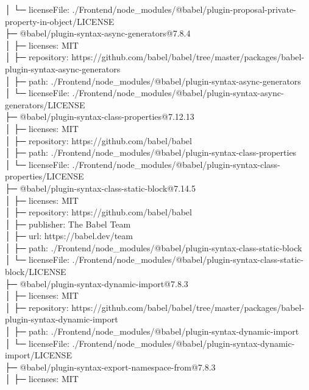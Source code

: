 \documentclass[
    paper=a4,
    twoside=false,
    parskip=half,
    listof=entryprefix,
    listof=totoc,
    index=totoc,
    bibliography=totoc,
    headsepline,
]{scrbook}
\begin{document}
    │  └─ licenseFile: ./Frontend/node\_modules/@babel/plugin-proposal-private-property-in-object/LICENSE\\
    ├─ @babel/plugin-syntax-async-generators@7.8.4\\
    │  ├─ licenses: MIT\\
    │  ├─ repository: https://github.com/babel/babel/tree/master/packages/babel-plugin-syntax-async-generators\\
    │  ├─ path: ./Frontend/node\_modules/@babel/plugin-syntax-async-generators\\
    │  └─ licenseFile: ./Frontend/node\_modules/@babel/plugin-syntax-async-generators/LICENSE\\
    ├─ @babel/plugin-syntax-class-properties@7.12.13\\
    │  ├─ licenses: MIT\\
    │  ├─ repository: https://github.com/babel/babel\\
    │  ├─ path: ./Frontend/node\_modules/@babel/plugin-syntax-class-properties\\
    │  └─ licenseFile: ./Frontend/node\_modules/@babel/plugin-syntax-class-properties/LICENSE\\
    ├─ @babel/plugin-syntax-class-static-block@7.14.5\\
    │  ├─ licenses: MIT\\
    │  ├─ repository: https://github.com/babel/babel\\
    │  ├─ publisher: The Babel Team\\
    │  ├─ url: https://babel.dev/team\\
    │  ├─ path: ./Frontend/node\_modules/@babel/plugin-syntax-class-static-block\\
    │  └─ licenseFile: ./Frontend/node\_modules/@babel/plugin-syntax-class-static-block/LICENSE\\
    ├─ @babel/plugin-syntax-dynamic-import@7.8.3\\
    │  ├─ licenses: MIT\\
    │  ├─ repository: https://github.com/babel/babel/tree/master/packages/babel-plugin-syntax-dynamic-import\\
    │  ├─ path: ./Frontend/node\_modules/@babel/plugin-syntax-dynamic-import\\
    │  └─ licenseFile: ./Frontend/node\_modules/@babel/plugin-syntax-dynamic-import/LICENSE\\
    ├─ @babel/plugin-syntax-export-namespace-from@7.8.3\\
    │  ├─ licenses: MIT\\
\end{document}
